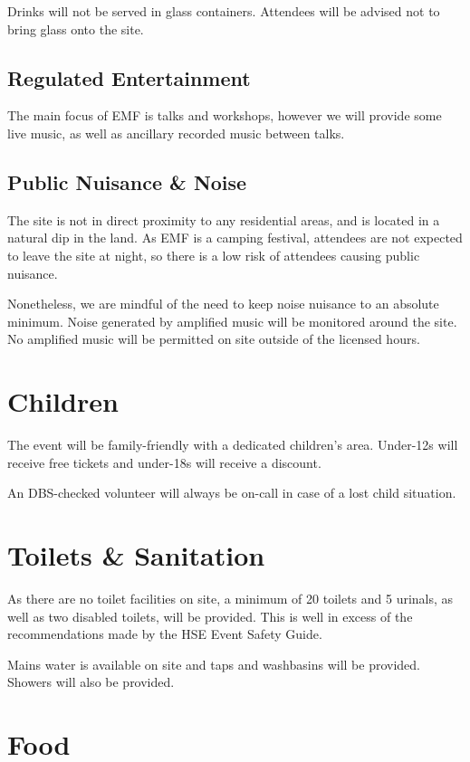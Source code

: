 Drinks will not be served in glass containers. Attendees will be advised not to bring
glass onto the site.

\subsection{Regulated Entertainment}

The main focus of EMF is talks and workshops, however we will provide some live music,
as well as ancillary recorded music between talks.

\subsection{Public Nuisance \& Noise}

The site is not in direct proximity to any residential areas, and is located in a
natural dip in the land. As EMF is a camping festival, attendees are not expected to leave the site
at night, so there is a low risk of attendees causing public nuisance.

Nonetheless, we are mindful of the need to keep noise nuisance
to an absolute minimum. Noise generated by amplified music will be monitored around the site.
No amplified music will be permitted on site outside of the licensed hours.

\section{Children}

The event will be family-friendly with a dedicated children's area. Under-12s will receive free tickets
and under-18s will receive a discount.

An DBS-checked volunteer will always be on-call in case of a lost child situation.

\section{Toilets \& Sanitation}

As there are no toilet facilities on site, a minimum of 20 toilets and 5 urinals, as well as two disabled toilets,
will be provided. This is well in excess of the recommendations made by the HSE Event Safety Guide.

Mains water is available on site and taps and washbasins will be provided. Showers will also be provided.

\section{Food}

